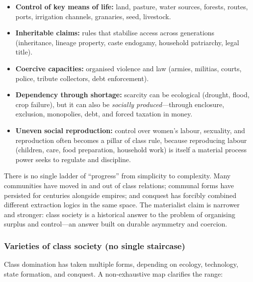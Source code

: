 \begin{itemize}[leftmargin=1.5em]
  \item \textbf{Control of key means of life:} land, pasture, water sources, forests, routes, ports, irrigation
        channels, granaries, seed, livestock.
  \item \textbf{Inheritable claims:} rules that stabilise access across generations (inheritance, lineage property,
        caste endogamy, household patriarchy, legal title).
  \item \textbf{Coercive capacities:} organised violence and law (armies, militias, courts, police, tribute collectors,
        debt enforcement).
  \item \textbf{Dependency through shortage:} scarcity can be ecological (drought, flood, crop failure), but it can also
        be \emph{socially produced}---through enclosure, exclusion, monopolies, debt, and forced taxation in money.\cite{Marx1867}
  \item \textbf{Uneven social reproduction:} control over women's labour, sexuality, and reproduction often becomes a pillar
        of class rule, because reproducing labour (children, care, food preparation, household work) is itself a material
        process power seeks to regulate and discipline.\cite{Scott2017}
\end{itemize}

There is no single ladder of ``progress'' from simplicity to complexity.
Many communities have moved in and out of class relations; communal forms have persisted for centuries alongside empires;
and conquest has forcibly combined different extraction logics in the same space. The materialist claim is narrower and
stronger: class society is a historical answer to the problem of organising surplus and control---an answer built on
durable asymmetry and coercion.

\subsubsection{Varieties of class society (no single staircase)}
\label{sec:varieties-class}

Class domination has taken multiple forms, depending on ecology, technology, state formation, and conquest. A non-exhaustive
map clarifies the range:

